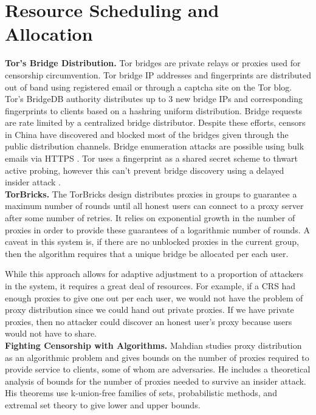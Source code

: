 \section{Resource Scheduling and Allocation}

\textbf{Tor's Bridge Distribution.} Tor bridges are private relays or proxies used for censorship circumvention. Tor bridge \ac{IP} addresses and fingerprints are distributed out of band using registered email or through a captcha site on the Tor blog. Tor's BridgeDB authority distributes up to 3 new bridge IPs and corresponding fingerprints to clients based on a hashring uniform distribution. Bridge requests are rate limited by a centralized bridge distributor. Despite these efforts, censors in China have discovered and blocked most of the bridges given through the public distribution channels. Bridge enumeration attacks are possible using bulk emails via \ac{HTTPS} \cite{ling2015tor}. Tor uses a fingerprint as a shared secret scheme to thwart active probing, however this can't prevent bridge discovery using a delayed insider attack \cite{fifield2016censors}. \\

\textbf{TorBricks.} The TorBricks \cite{zamani2017torbricks} design distributes proxies in groups to guarantee a maximum number of rounds until all honest users can connect to a proxy server after some number of retries. It relies on exponential growth in the number of proxies in order to provide these guarantees of a logarithmic number of rounds. A caveat in this system is, if there are no unblocked proxies in the current group, then the algorithm requires that a unique bridge be allocated per each user. 

While this approach allows for adaptive adjustment to a proportion of attackers in the system, it requires a great deal of resources. For example, if a \ac{CRS} had enough proxies to give one out per each user, we would not have the problem of proxy distribution since we could hand out private proxies. If we have private proxies, then no attacker could discover an honest user's proxy because users would not have to share.\\

\textbf{Fighting Censorship with Algorithms.}
Mahdian \cite{mahdian2010fighting} studies proxy distribution as an algorithmic problem and gives bounds on the number of proxies required to provide service to clients, some of whom are adversaries. He includes a theoretical analysis of bounds for the number of proxies needed to survive an insider attack. His theorems use k-union-free families of sets, probabilistic methods, and extremal set theory to give lower and upper bounds. 

